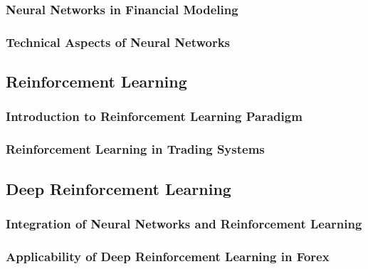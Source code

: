 \subsubsection{Neural Networks in Financial Modeling}

\subsubsection{Technical Aspects of Neural Networks}

\subsection{Reinforcement Learning}

\subsubsection{Introduction to Reinforcement Learning Paradigm}

\subsubsection{Reinforcement Learning in Trading Systems}

\subsection{Deep Reinforcement Learning}

\subsubsection{Integration of Neural Networks and Reinforcement Learning}

\subsubsection{Applicability of Deep Reinforcement Learning in Forex}

